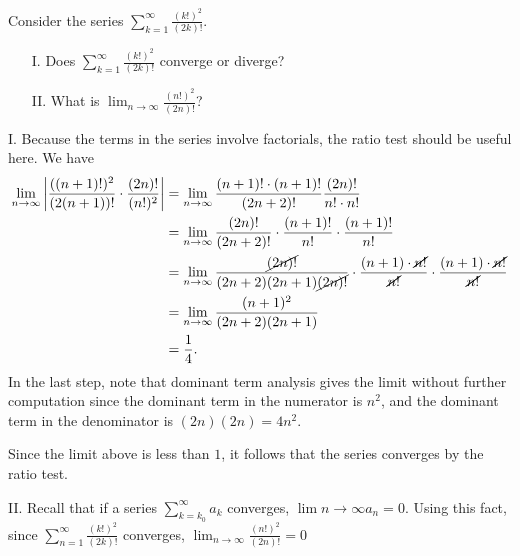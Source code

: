 \documentclass[noauthor]{ximera}
\begin{document}
\begin{problem}
Consider the series $\sum_{k=1}^\infty \frac{(k!)^2}{(2k)!}$.
\begin{itemize}
\item[I.] Does $\sum_{k=1}^\infty \frac{(k!)^2}{(2k)!}$ converge or diverge?
\item[II.] What is $\lim_{n \to \infty} \frac{(n!)^2}{(2n)!}$?
\end{itemize}

\begin{freeResponse}

I. Because the terms in the series involve factorials, the ratio test should be useful here. We have 
\begin{align*}
\lim_{n \rightarrow \infty} \left|\frac{((n+1)!)^2}{(2(n+1))!} \cdot \frac{(2n)!}{(n!)^2} \right| &= \lim_{n \rightarrow \infty} \frac{(n+1)! \cdot (n+1)!}{(2n+2)!} \frac{(2n)!}{n! \cdot n!} \\
&= \lim_{n \rightarrow \infty} \frac{(2n)!}{(2n+2)!} \cdot \frac{(n+1)!}{n!} \cdot \frac{(n+1)!}{n!} \\
&= \lim_{n \rightarrow \infty} \frac{\cancel{(2n)!}}{(2n+2)(2n+1)\cancel{(2n)!}} \cdot \frac{(n+1) \cdot \cancel{n!} }{\cancel{n!}} \cdot \frac{(n+1) \cdot \cancel{n!} }{\cancel{n!}} \\
&= \lim_{n \rightarrow \infty} \frac{(n+1)^2}{(2n+2)(2n+1)}  \\
&= \frac{1}{4}.
\end{align*}
In the last step, note that dominant term analysis gives the limit without further computation since the dominant term in the numerator is $n^2$, and the dominant term in the denominator is $(2n)(2n) =4n^2$.

Since the limit above is less than $1$, it follows that the series converges by the ratio test.

II. Recall that if a series $\sum_{k=k_0}^{\infty} a_k$ converges, $\lim{n \to \infty} a_n =0$.  Using this fact, since $\sum_{n=1}^\infty \frac{(k!)^2}{(2k)!}$ converges, $\lim_{n \to \infty} \frac{(n!)^2}{(2n)!} = 0$

\end{freeResponse}
\end{problem}
\end{document}
